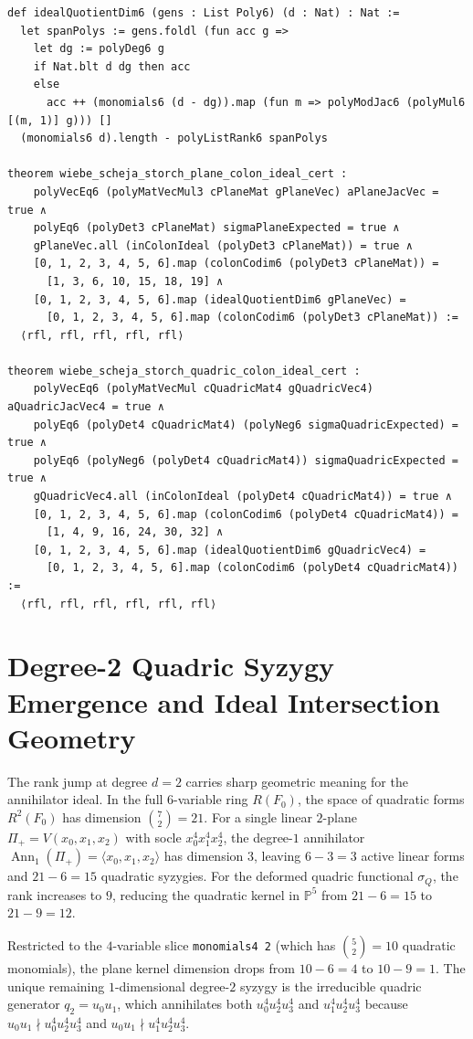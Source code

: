 \documentclass[11pt,a4paper]{article}
\begin{document}
\begin{lstlisting}[caption={6-variable Wiebe--Scheja--Storch $4 \times 4$ matrix factorization and colon-ideal theorems in \texttt{WiebeSchejaStorch.lean}.}]
def idealQuotientDim6 (gens : List Poly6) (d : Nat) : Nat :=
  let spanPolys := gens.foldl (fun acc g =>
    let dg := polyDeg6 g
    if Nat.blt d dg then acc
    else
      acc ++ (monomials6 (d - dg)).map (fun m => polyModJac6 (polyMul6 [(m, 1)] g))) []
  (monomials6 d).length - polyListRank6 spanPolys

theorem wiebe_scheja_storch_plane_colon_ideal_cert :
    polyVecEq6 (polyMatVecMul3 cPlaneMat gPlaneVec) aPlaneJacVec = true ∧
    polyEq6 (polyDet3 cPlaneMat) sigmaPlaneExpected = true ∧
    gPlaneVec.all (inColonIdeal (polyDet3 cPlaneMat)) = true ∧
    [0, 1, 2, 3, 4, 5, 6].map (colonCodim6 (polyDet3 cPlaneMat)) =
      [1, 3, 6, 10, 15, 18, 19] ∧
    [0, 1, 2, 3, 4, 5, 6].map (idealQuotientDim6 gPlaneVec) =
      [0, 1, 2, 3, 4, 5, 6].map (colonCodim6 (polyDet3 cPlaneMat)) :=
  ⟨rfl, rfl, rfl, rfl, rfl⟩

theorem wiebe_scheja_storch_quadric_colon_ideal_cert :
    polyVecEq6 (polyMatVecMul cQuadricMat4 gQuadricVec4) aQuadricJacVec4 = true ∧
    polyEq6 (polyDet4 cQuadricMat4) (polyNeg6 sigmaQuadricExpected) = true ∧
    polyEq6 (polyNeg6 (polyDet4 cQuadricMat4)) sigmaQuadricExpected = true ∧
    gQuadricVec4.all (inColonIdeal (polyDet4 cQuadricMat4)) = true ∧
    [0, 1, 2, 3, 4, 5, 6].map (colonCodim6 (polyDet4 cQuadricMat4)) =
      [1, 4, 9, 16, 24, 30, 32] ∧
    [0, 1, 2, 3, 4, 5, 6].map (idealQuotientDim6 gQuadricVec4) =
      [0, 1, 2, 3, 4, 5, 6].map (colonCodim6 (polyDet4 cQuadricMat4)) :=
  ⟨rfl, rfl, rfl, rfl, rfl, rfl⟩
\end{lstlisting}

\section{Degree-2 Quadric Syzygy Emergence and Ideal Intersection Geometry}

The rank jump at degree $d = 2$ carries sharp geometric meaning for the annihilator ideal. In the full $6$-variable ring $R(F_0)$, the space of quadratic forms $R^2(F_0)$ has dimension $\binom{7}{2} = 21$. For a single linear $2$-plane $\Pi_+ = V(x_0, x_1, x_2)$ with socle $x_0^4 x_1^4 x_2^4$, the degree-$1$ annihilator $\operatorname{Ann}_1(\Pi_+) = \langle x_0, x_1, x_2 \rangle$ has dimension $3$, leaving $6 - 3 = 3$ active linear forms and $21 - 6 = 15$ quadratic syzygies. For the deformed quadric functional $\sigma_Q$, the rank increases to $9$, reducing the quadratic kernel in $\mathbb{P}^5$ from $21 - 6 = 15$ to $21 - 9 = 12$.

Restricted to the $4$-variable slice \texttt{monomials4 2} (which has $\binom{5}{2} = 10$ quadratic monomials), the plane kernel dimension drops from $10 - 6 = 4$ to $10 - 9 = 1$. The unique remaining $1$-dimensional degree-$2$ syzygy is the irreducible quadric generator $q_2 = u_0 u_1$, which annihilates both $u_0^4 u_2^4 u_3^4$ and $u_1^4 u_2^4 u_3^4$ because $u_0 u_1 \nmid u_0^4 u_2^4 u_3^4$ and $u_0 u_1 \nmid u_1^4 u_2^4 u_3^4$.
\end{document}
